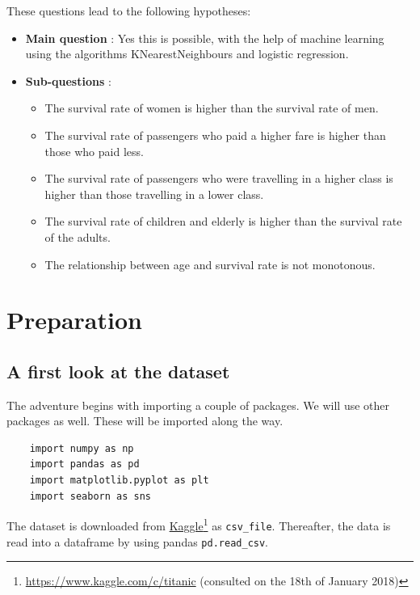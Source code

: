 \documentclass[11pt]{article}
\begin{document}
These questions lead to the following hypotheses:

\begin{itemize}
\item \textbf{Main question} : Yes this is possible, with the help of machine learning using the algorithms KNearestNeighbours and logistic regression.
\item \textbf{Sub-questions} :

\begin{itemize}
\item The survival rate of women is higher than the survival rate of men.
\item The survival rate of passengers who paid a higher fare is higher than those who paid less.
\item The survival rate of passengers who were travelling in a higher class is higher than those travelling in a lower class.
\item The survival rate of children and elderly is higher than the survival rate of the adults.
\item The relationship between age and survival rate is not monotonous.
\end{itemize}
\end{itemize}


\newpage
\section{Preparation}
\label{sec:orgea48592}

\subsection{A first look at the dataset}
\label{sec:org88d44be}

The adventure begins with importing a couple of packages. We will use other packages as well. These will be imported along the way.

\begin{verbatim}
    import numpy as np
    import pandas as pd
    import matplotlib.pyplot as plt
    import seaborn as sns
\end{verbatim}

The dataset is downloaded from \href{https://www.kaggle.com/c/titanic/data}{Kaggle}\footnote{\url{https://www.kaggle.com/c/titanic} (consulted on the 18th of January 2018)} as \texttt{csv\_file}. Thereafter, the data is read into a dataframe by using pandas \texttt{pd.read\_csv}. 
\end{document}
